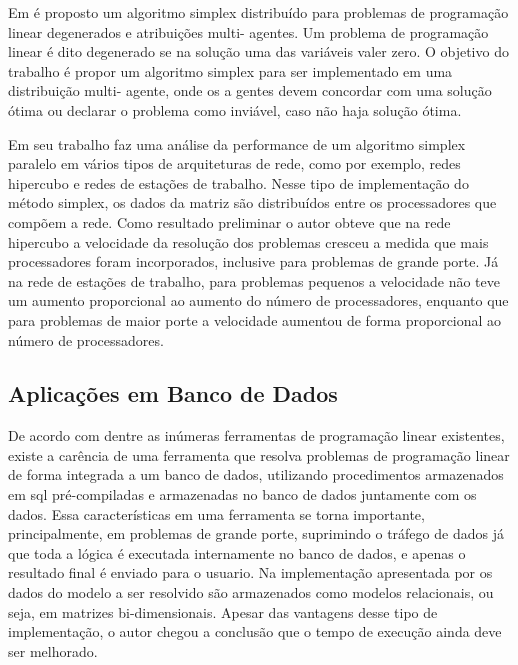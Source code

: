 Em  é proposto um algoritmo simplex distribuído para problemas de programação linear degenerados e atribuições multi- agentes. Um problema de programação linear é dito degenerado se na solução uma das variáveis valer zero. O objetivo do trabalho é propor um algoritmo simplex para ser implementado em uma distribuição multi- agente, onde os a gentes devem concordar com uma solução ótima ou declarar o problema como inviável, caso não haja solução ótima.

Em seu trabalho  faz uma análise da performance de um algoritmo simplex paralelo em vários tipos de arquiteturas de rede, como por exemplo, redes hipercubo e redes de estações de trabalho. Nesse tipo de implementação do método simplex, os dados da matriz são distribuídos entre os processadores que compõem a rede. Como resultado preliminar o autor obteve que na rede hipercubo a velocidade da resolução dos problemas cresceu a medida que mais processadores foram incorporados, inclusive para problemas de grande porte. Já na rede de estações de trabalho, para problemas pequenos a velocidade não teve um aumento proporcional ao aumento do número de processadores, enquanto que para problemas de maior porte a velocidade aumentou de forma proporcional ao número de processadores.

\subsection{Aplicações em Banco de Dados}
De acordo com  dentre as inúmeras ferramentas de programação linear existentes, existe a carência de uma ferramenta que resolva problemas de programação linear de forma integrada a um banco de dados, utilizando procedimentos armazenados em sql pré-compiladas e armazenadas no banco de dados juntamente com os dados. Essa características em uma ferramenta se torna importante, principalmente, em problemas de grande porte, suprimindo o tráfego de dados já que toda a lógica é executada internamente no banco de dados, e apenas o resultado final é enviado para o usuario. Na implementação apresentada por  os dados do modelo a ser resolvido são armazenados como modelos relacionais, ou seja, em matrizes bi-dimensionais. Apesar das vantagens desse tipo de implementação, o autor chegou a conclusão que o tempo de execução ainda deve ser melhorado.


